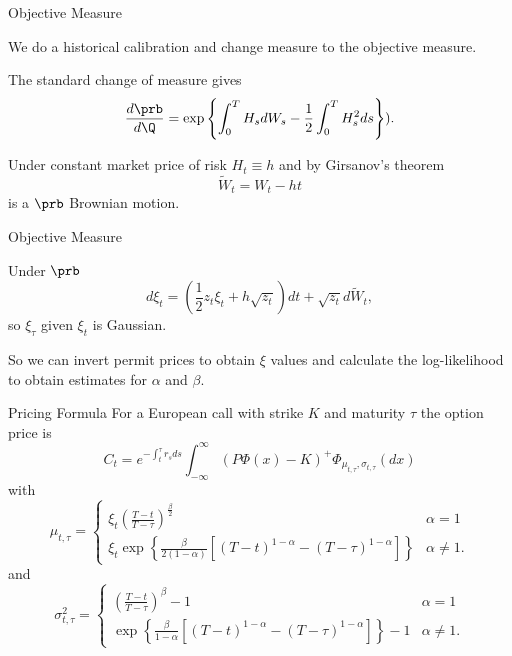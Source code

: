 


{Objective Measure}






	We do a historical calibration and change measure to the objective measure.


	The standard change of measure gives
$$
\frac{d\prb}{d\Q} = \exp\left\{\int_0^T H_s dW_s -\frac{1}{2} \int_0^T H_s^2ds \right\}).
$$


	
Under constant market price of risk $H_t \equiv h$ and by Girsanov's theorem
$$
\tilde{W}_t = W_t - ht
$$
is a $\prb$ Brownian motion.





{Objective Measure}






	
Under $\prb$
$$
d\xi_t = \left(\frac{1}{2} z_t \xi_t + h \sqrt{z_t} \right)dt + \sqrt{z_t} d\tilde{W}_t,
$$
so $\xi_{\tau}$ given $\xi_t$ is Gaussian.


	So we can invert permit prices to obtain $\xi$ values and calculate the log-likelihood to obtain
estimates for $\alpha$ and $\beta$.






{Pricing Formula}
For a European call with strike $K$ and maturity $\tau$ the option price is
$$
C_t = e^{-\int_t^\tau r_s ds} \int_{-\infty}^\infty (P\Phi(x)-K)^+ \Phi_{\mu_{t,\tau}, \sigma_{t,\tau}}(dx)
$$
with
$$
\mu_{t,\tau}=
\left\{
\begin{array}{ll}
\xi_t \left(\frac{T-t}{T-\tau}\right)^{\frac{\beta}{2}} & \alpha =1\\
\xi_t \exp\left\{\frac{\beta}{2(1-\alpha)}[(T-t)^{1-\alpha}-(T-\tau)^{1-\alpha}]\right\} & \alpha \not= 1.
\end{array}
\right.
$$
and
$$
\sigma^2_{t,\tau}=
\left\{
\begin{array}{ll}
\left(\frac{T-t}{T-\tau}\right)^\beta-1 & \alpha =1\\
\exp\left\{\frac{\beta}{1-\alpha}[(T-t)^{1-\alpha}-(T-\tau)^{1-\alpha}]\right\}-1 & \alpha \not= 1.
\end{array}
\right.
$$

